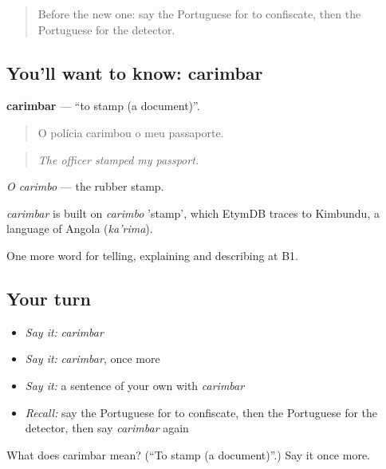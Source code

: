 \label{lesson:PT-C423-carimbar}



\begin{quote}
Before the new one: say the Portuguese for to confiscate, then the Portuguese for the detector.
\end{quote}

\subsection*{You'll want to know: carimbar}
\textbf{carimbar} — \textquotedblleft{}to stamp (a document)\textquotedblright{}.

\begin{quote}
O polícia carimbou o meu passaporte.
\end{quote}

\begin{quote}
\emph{The officer stamped my passport.}
\end{quote}

\emph{O carimbo} — the rubber stamp.

\begin{cousinweb}
\emph{carimbar} is built on \emph{carimbo} 'stamp', which EtymDB traces to Kimbundu, a language of Angola (\emph{ka'rima}).
\end{cousinweb}

\begin{grammarlens}[title={What you've built}]
One more word for telling, explaining and describing at B1.
\end{grammarlens}

\subsection*{Your turn}
\begin{itemize}
\raggedright
  \item \emph{Say it:} \emph{carimbar}
  \item \emph{Say it:} \emph{carimbar}, once more
  \item \emph{Say it:} a sentence of your own with \emph{carimbar}
  \item \emph{Recall:} say the Portuguese for to confiscate, then the Portuguese for the detector, then say \emph{carimbar} again
\end{itemize}

\begin{tcolorbox}[breakable,colback=teal!4,colframe=teal!35!black,title={Before you move on}]
What does carimbar mean? (\textquotedblleft{}To stamp (a document)\textquotedblright{}.) Say it once more.
\end{tcolorbox}

